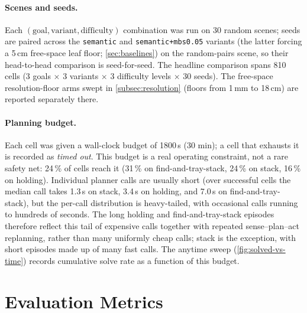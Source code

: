 \paragraph{Scenes and seeds.} Each $(\text{goal}, \text{variant}, \text{difficulty})$ combination was run on 30 random scenes; seeds are paired across the \texttt{semantic} and \texttt{semantic+mbs0.05} variants (the latter forcing a 5\,cm free-space leaf floor; \cref{sec:baselines}) on the random-pairs scene, so their head-to-head comparison is seed-for-seed. The headline comparison spans 810 cells (3 goals $\times$ 3 variants $\times$ 3 difficulty levels $\times$ 30 seeds). The free-space resolution-floor arms swept in \cref{subsec:resolution} (floors from 1\,mm to 18\,cm) are reported separately there.

\paragraph{Planning budget.} Each cell was given a wall-clock budget of 1800\,s (30 min); a cell that exhausts it is recorded as \emph{timed out}. This budget is a real operating constraint, not a rare safety net: 24\,\% of cells reach it (31\,\% on find-and-tray-stack, 24\,\% on stack, 16\,\% on holding). Individual planner calls are usually short (over successful cells the median call takes 1.3\,s on stack, 3.4\,s on holding, and 7.0\,s on find-and-tray-stack), but the per-call distribution is heavy-tailed, with occasional calls running to hundreds of seconds. The long holding and find-and-tray-stack episodes therefore reflect this tail of expensive calls together with repeated sense--plan--act replanning, rather than many uniformly cheap calls; stack is the exception, with short episodes made up of many fast calls. The anytime sweep (\cref{fig:solved-vs-time}) records cumulative solve rate as a function of this budget.

\section{Evaluation Metrics}
\label{sec:metrics}

